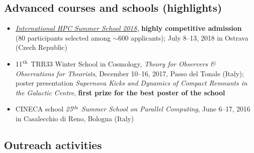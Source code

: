 \documentclass[11pt,a4paper]{article}
\begin{document}
\subsection*{Advanced courses and schools (highlights)}

\begin{itemize}

    \item \href{http://ihpcss18.it4i.cz/}{\textit{International HPC Summer School 2018,}} {\bf highly competitive admission} (80 participants selected among $\sim$600 applicants); July 8--13, 2018 in Ostrava (Czech Republic)

    
    \item 11$^{\rm th}$ TRR33 Winter School in Cosmology, {\it Theory for Observers \& Observations for Theorists}, December 10--16, 2017, Passo del Tonale (Italy); { poster presentation} {\it Supernova Kicks and Dynamics of Compact Remnants in the Galactic Centre}, \textbf{  first prize for the best poster of the school} 
    
    

    \item CINECA school \textit{{ 25$^{\rm th}$ Summer School on Parallel Computing}}, June 6--17, 2016 in Casalecchio di Reno, Bologna (Italy)

    
    
\end{itemize}

\subsection*{Outreach activities}
\end{document}
